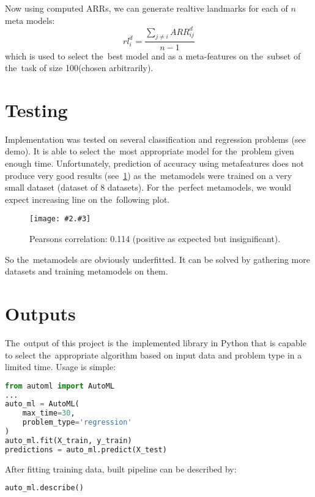 \documentclass[hidelinks, english]{mvi-report}
\newcommand{\smplimage}[3][1]{
\centerline{
    \texttt{[image: \#2.\#3]}
}
}
\newcommand{\image}[4][1]{
\begin{figure}[H]
    \smplimage[#1]{#2}{#3}
    \caption{#4}
    \label{fig:#2}
\end{figure}
}
\begin{document}
Now using computed ARRs, we can generate realtive landmarks for each of $n$ meta models:
\[ rl^d_i = \dfrac{\sum_{j \neq i}ARR^d_{ij}}{n - 1} \]
which is used to select the~best model and as a meta-features on the~subset of the~task of size 100(chosen arbitrarily).

\section{Testing}
Implementation was tested on several classification and regression problems (see demo). It is able to select the~most
appropriate model for the~problem given enough time. Unfortunately, prediction of accuracy using metafeatures does not
produce very good results (see~\cref{fig:corr}) as the~metamodels were trained on a very small dataset (dataset of 8
datasets). For the~perfect metamodels, we would expect increasing line on the~following plot.

\image[0.5]{corr}{png}{Pearsons correlation: 0.114 (positive as expected but insignificant).}

So the~metamodels are obviously underfitted. It can be solved by gathering more datasets and training metamodels on them.

\pagebreak
\section{Outputs}
The~output of this project is the~implemented library in Python that is capable to select the~appropriate algorithm
based on input data and problem type in a limited time. Usage is simple:

\vspace{0.5cm}
\begin{lstlisting}[language=Python]
from automl import AutoML
...
auto_ml = AutoML(
    max_time=30,
    problem_type='regression'
)
auto_ml.fit(X_train, y_train)
predictions = auto_ml.predict(X_test)

\end{lstlisting}
\vspace{0.5cm}

After fitting training data, built pipeline can be described by:
\vspace{0.5cm}
\begin{lstlisting}[language=Python]
auto_ml.describe()
\end{lstlisting}
\vspace{0.5cm}
\end{document}
